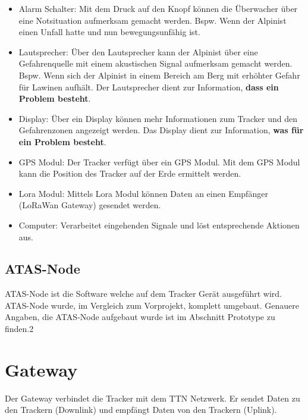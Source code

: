 \documentclass[11pt,english,german]{report}
\theoremstyle{definition}
\begin{document}
\begin{itemize}
	\item
	Alarm Schalter: Mit dem Druck auf den Knopf können die Überwacher über eine Notsituation aufmerksam gemacht werden. Bspw. Wenn der Alpinist einen Unfall hatte und nun bewegungsunfähig ist.
	\item
	Lautsprecher: Über den Lautsprecher kann der Alpinist über eine Gefahrenquelle mit einem akustischen Signal aufmerksam gemacht werden. Bspw. Wenn sich der Alpinist in einem Bereich am Berg mit erhöhter Gefahr für Lawinen aufhält. Der Lautsprecher dient zur Information, \textbf{dass ein Problem besteht}.
	\item
	Display: Über ein Display können mehr Informationen zum Tracker und den Gefahrenzonen angezeigt werden. Das Display dient zur Information, \textbf{was für ein Problem besteht}.
	\item
	GPS Modul: Der Tracker verfügt über ein GPS Modul. Mit dem GPS Modul kann die Position des Tracker auf der Erde ermittelt werden.
	\item 
	Lora Modul: Mittels Lora Modul können Daten an einen Empfänger (LoRaWan Gateway) gesendet werden.
	\item 
	Computer: Verarbeitet eingehenden Signale und löst entsprechende Aktionen aus.
\end{itemize}

\newpage
\subsection{ATAS-Node}
ATAS-Node ist die Software welche auf dem Tracker Gerät ausgeführt wird. ATAS-Node wurde, im Vergleich zum Vorprojekt, komplett umgebaut. Genauere Angaben, die ATAS-Node aufgebaut wurde ist im Abschnitt Prototype zu finden.2

\newpage
\section{Gateway}
Der Gateway verbindet die Tracker mit dem \gls{TTN} Netzwerk. Er sendet Daten zu den Trackern (\gls{Downlink}) und empfängt Daten von den Trackern (\gls{Uplink}).
\end{document}
